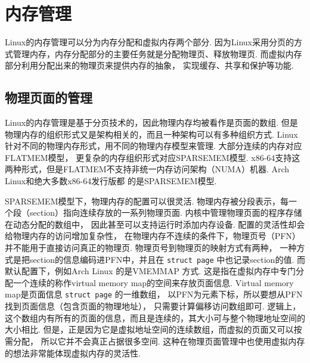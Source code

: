 \section{内存管理} \label{memory management}

Linux的内存管理可以分为内存分配和虚拟内存两个部分.\cite{silberschatz2021operating}
因为Linux采用分页的方式管理内存，内存分配部分的主要任务就是分配物理页、释放物理页.
而虚拟内存部分利用分配出来的物理页来提供内存的抽象，
实现缓存、共享和保护等功能.

\subsection{物理页面的管理}
Linux的内存管理是基于分页技术的，因此物理内存均被看作是页面的数组.
但是物理内存的组织形式又是架构相关的，而且一种架构可以有多种组织方式.
Linux针对不同的物理内存形式，用不同的物理内存模型来管理.
大部分连续的内存对应FLATMEM模型，
更复杂的内存组织形式对应SPARSEMEM模型.\cite{Physical36:online}
x86-64支持这两种形式，但是FLATMEM不支持非统一内存访问架构（NUMA）机器.
Arch Linux和绝大多数x86-64发行版都%
的是SPARSEMEM模型.

SPARSEMEM模型下，物理内存的配置可以很灵活.
物理内存被分段表示，每一个段（section）指向连续存放的一系列物理页面.
内核中管理物理页面的程序存储在动态分配的数组中，
因此甚至可以支持运行时添加内存设备.
配置的灵活性却会给物理内存的访问增加复杂性，
在物理内存不连续的条件下，物理页号（PFN）并不能用于直接访问真正的物理页.
物理页号到物理页的映射方式有两种，
一种方式是把section的信息编码进PFN中，并且在 \lstinline{struct page}
中也记录section的值.
而默认配置下，例如Arch Linux 的是VMEMMAP 方式.
这是指在虚拟内存中专门分配一个连续的称作virtual memory map的空间来存放页面信息.
Virtual memory map是页面信息
\lstinline{struct page}
的一维数组，
以PFN为元素下标，所以要想从PFN找到页面信息（包含页面的物理地址），
只需要计算偏移访问数组即可.
逻辑上，这个数组内有所有的页面的信息，而且是连续的，其大小可与整个物理地址空间的大小相比.
但是，正是因为它是虚拟地址空间的连续数组，而虚拟的页面又可以按需分配，
所以它并不会真正占据很多空间.
这种在物理页面管理中也使用虚拟内存的想法非常能体现虚拟内存的灵活性.

